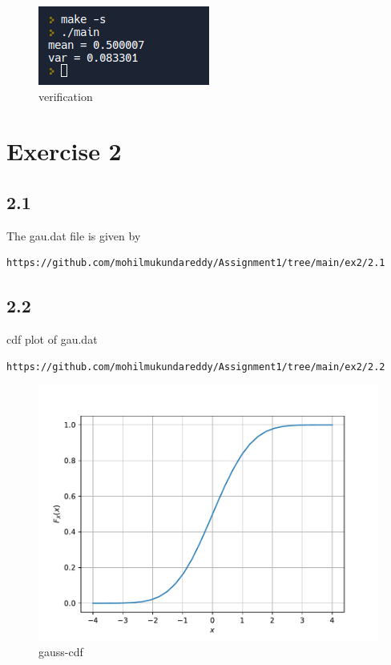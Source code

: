 \documentclass[journal,12pt,twocolumn]{IEEEtran}
\begin{document}
\begin{figure}[H]
    \centering
    \includegraphics{verify.png}
    \caption{verification}
    \label{fig:my_verify1.4}
\end{figure}

\section*{Exercise 2}

\subsection*{2.1}
The gau.dat file is given by
\begin{lstlisting}
https://github.com/mohilmukundareddy/Assignment1/tree/main/ex2/2.1
\end{lstlisting}

\subsection*{2.2}
cdf plot of gau.dat
\begin{lstlisting}
https://github.com/mohilmukundareddy/Assignment1/tree/main/ex2/2.2
\end{lstlisting}
\begin{figure}[H]
    \centering
    \includegraphics[scale = 0.5]{gau_cdf.pdf}
    \caption{gauss-cdf}
    \label{fig:my_cdfgau}
\end{figure}
\end{document}
